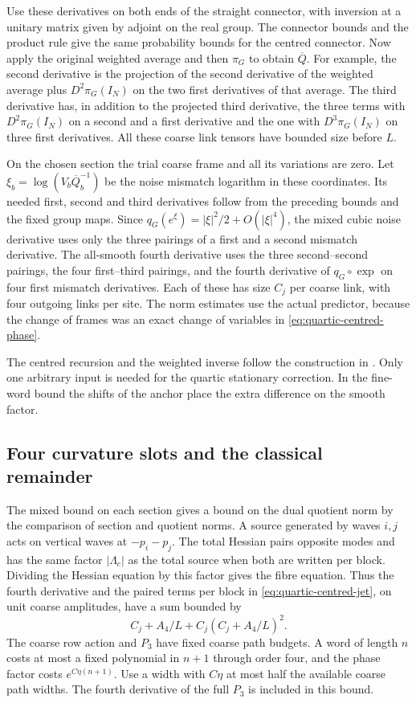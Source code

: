 \documentclass[11pt,reqno]{amsart}
\numberwithin{equation}{section}
\theoremstyle{definition}
\theoremstyle{remark}
\begin{document}
Use these derivatives on both ends of the straight connector,
with inversion at a unitary matrix given by adjoint on the
real group. The connector bounds and the product rule give
the same probability bounds for the centred connector.
Now apply the original weighted average and then \(\pi_G\)
to obtain \(\overline Q\). For example, the second derivative
is the projection of the second derivative of the weighted
average plus \(D^2\pi_G(I_N)\) on the two first derivatives
of that average. The third derivative has, in addition to
the projected third derivative, the three terms with
\(D^2\pi_G(I_N)\) on a second and a first derivative and the
one with \(D^3\pi_G(I_N)\) on three first derivatives. All
these coarse link tensors have bounded size before \(L\).

On the chosen section the trial coarse frame and all its
variations are zero. Let \(\xi_b=\log(V_b\overline Q_b^{-1})\)
be the noise mismatch logarithm in these coordinates.
Its needed first, second and third derivatives follow from
the preceding bounds and the fixed group maps. Since
\(q_G(e^{\xi})=|\xi|^2/2+O(|\xi|^4)\), the mixed cubic
noise derivative uses only the three pairings of a first
and a second mismatch derivative. The all-smooth fourth
derivative uses the three second--second pairings, the four
first--third pairings, and the fourth derivative of
\(q_G\circ\exp\) on four first mismatch derivatives.
Each of these has size \(C_j\) per coarse link, with four
outgoing links per site. The norm estimates use the actual
predictor, because the change of frames was an exact change
of variables in \eqref{eq:quartic-centred-phase}.

The centred recursion and the weighted inverse follow the
construction in \cite[Lemmas~36.4--36.5 and
Proposition~36.6, pp.~236--243]{Main}. Only one arbitrary input
is needed for the quartic stationary correction. In the
fine-word bound the shifts of the anchor place the extra
difference on the smooth factor.


\subsection{Four curvature slots and the classical remainder}

The mixed bound on each section gives a bound on the dual
quotient norm by the comparison of section and quotient
norms. A source generated by waves \(i,j\) acts on vertical
waves at \(-p_i-p_j\). The total Hessian pairs opposite modes
and has the same factor \(|\Lambda_c|\) as the total source
when both are written per block. Dividing the Hessian
equation by this factor gives the fibre equation. Thus the
fourth derivative and the paired terms per block in
\eqref{eq:quartic-centred-jet}, on unit coarse amplitudes, have
a sum bounded by
\[
              C_j+A_4/L+C_j(C_j+A_4/L)^2 .
\]
The coarse row action and \(P_3\) have fixed coarse path
budgets. A word of length \(n\) costs at most a fixed
polynomial in \(n+1\) through order four, and the phase
factor costs \(e^{C\eta(n+1)}\).
Use a width with \(C\eta\) at most half the available coarse
path widths. The fourth derivative of the full \(P_3\) is
included in this bound.
\end{document}
